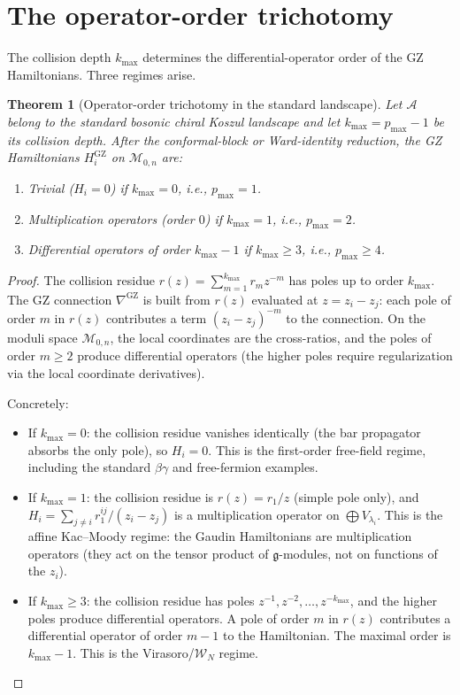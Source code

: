 \documentclass[11pt]{article}
\theoremstyle{plain}
\newtheorem{theorem}{Theorem}[section]
\theoremstyle{definition}
\theoremstyle{remark}
\newcommand{\fg}{\mathfrak{g}}
\newcommand{\cA}{\mathcal{A}}
\newcommand{\cW}{\mathcal{W}}
\numberwithin{equation}{section}
\begin{document}
\section{The operator-order trichotomy}\label{sec:trichotomy}

The collision depth $k_{\max}$ determines the differential-operator
order of the GZ Hamiltonians. Three regimes arise.

\begin{theorem}[Operator-order trichotomy in the standard landscape]
\label{thm:operator-trichotomy}
Let $\cA$ belong to the standard bosonic chiral Koszul landscape and
let \(k_{\max}=p_{\max}-1\) be its collision depth. After the
conformal-block or Ward-identity reduction, the GZ Hamiltonians
\(H_i^{\mathrm{GZ}}\) on \(\mathcal M_{0,n}\) are:
\begin{enumerate}[label=\textup{(\roman*)}]
 \item \emph{Trivial} ($H_i = 0$) if $k_{\max} = 0$, i.e.,
 $p_{\max} = 1$.
 \item \emph{Multiplication operators} (order $0$) if
 $k_{\max} = 1$, i.e., $p_{\max} = 2$.
 \item \emph{Differential operators of order $k_{\max} - 1$} if
 $k_{\max} \geq 3$, i.e., $p_{\max} \geq 4$.
\end{enumerate}
\end{theorem}

\begin{proof}
The collision residue $r(z) = \sum_{m=1}^{k_{\max}} r_m z^{-m}$
has poles up to order $k_{\max}$. The GZ connection
$\nabla^{\mathrm{GZ}}$ is built from $r(z)$ evaluated at
$z = z_i - z_j$: each pole of order $m$ in $r(z)$ contributes a
term $(z_i - z_j)^{-m}$ to the connection. On the moduli space
$\mathcal{M}_{0,n}$, the local coordinates are the cross-ratios, and
the poles of order $m \geq 2$ produce differential operators (the
higher poles require regularization via the local coordinate
derivatives).

Concretely:
\begin{itemize}
 \item If $k_{\max} = 0$: the collision residue vanishes identically
 (the bar propagator absorbs the only pole), so $H_i = 0$. This
 is the first-order free-field regime, including the standard
 $\beta\gamma$ and free-fermion examples.
 \item If $k_{\max} = 1$: the collision residue is $r(z) = r_1/z$
 (simple pole only), and
 $H_i = \sum_{j \neq i} r_1^{ij}/(z_i - z_j)$ is a
 multiplication operator on $\bigoplus V_{\lambda_i}$. This is
 the affine Kac--Moody regime: the Gaudin Hamiltonians are
 multiplication operators (they act on the tensor product of
 $\fg$-modules, not on functions of the $z_i$).
 \item If $k_{\max} \geq 3$: the collision residue has poles
 $z^{-1}, z^{-2}, \ldots, z^{-k_{\max}}$, and the higher poles
 produce differential operators. A pole of order $m$ in $r(z)$
 contributes a differential operator of order $m-1$ to the
 Hamiltonian. The maximal order is $k_{\max} - 1$. This is the
 Virasoro/$\cW_N$ regime.
\end{itemize}
\end{proof}
\end{document}
